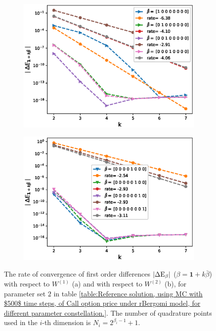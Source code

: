 \begin{figure}[h!]
	\centering
	\begin{subfigure}{.4\textwidth}
		\centering
		\includegraphics[width=1\linewidth]{./figures/rBergomi_mixed_error_rates/without_change_measure/N_4/H_002/first_difference_rbergomi_4steps_H_002_K_1_totally_hierarch_with_rate_W1}
		\caption{}
		\label{fig:sub3}
	\end{subfigure}%
	\begin{subfigure}{.4\textwidth}
		\centering
		\includegraphics[width=1\linewidth]{./figures/rBergomi_mixed_error_rates/without_change_measure/N_4/H_002/first_difference_rbergomi_4steps_H_002_K_1_totally_hierarch_with_rate_W2}
		\caption{}
		\label{fig:sub4}
	\end{subfigure}
	
	
	
	\caption{The rate of convergence of  first order differences $\left\lvert\Delta \text{E}_{\beta}\right\rvert$ ($\beta=\mathbf{1}+k \bar{\beta}$) with respect to $W^{(1)}$ (a)  and  with respect to $W^{(2)}$ (b), for parameter set $2$ in table \ref{table:Reference solution, using MC with $500$ time steps, of Call option price under rBergomi model, for different parameter constellation.}. The number of quadrature points used in the $i$-th dimension is $N_i=2^{\beta_i-1}+1$. }
	\label{fig:first_diff_comp_K_1_H_002}
\end{figure}


